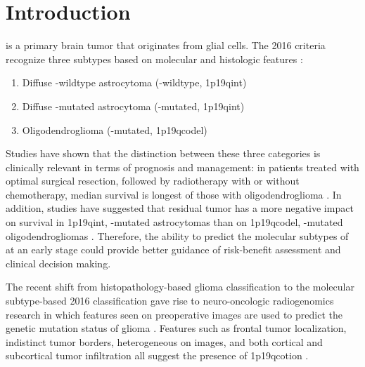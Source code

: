 \section{Introduction}

 is a primary brain \gls{tumor} that originates from glial cells.
The  2016 criteria recognize three subtypes based on molecular and histologic features \autocite{louis20162016,van2017diffuse}:

\begin{enumerate}
\item Diffuse -wildtype astrocytoma (-wildtype, \acl{1p19qint})
\item Diffuse -mutated astrocytoma (-mutated, \acl{1p19qint})
\item Oligodendroglioma (-mutated, \acl{1p19qcodel})
\end{enumerate}

Studies have shown that the distinction between these three categories is clinically relevant in terms of prognosis and management: in patients treated with optimal surgical resection, followed by radiotherapy with or without chemotherapy, median survival is longest of those with oligodendroglioma \autocite{cairncross2014benefit, dubbink2015molecular}.
In addition, studies have suggested that residual \gls{tumor} has a more negative impact on survival in \acl{1p19qint}, -mutated astrocytomas than on \acl{1p19qcodel}, -mutated oligodendrogliomas \autocite{wijnenga2017impact, clark2019extent}.
Therefore, the ability to predict the molecular subtypes of  at an early stage could provide better guidance of risk-benefit assessment and clinical decision making.

The recent shift from histopathology-based glioma classification to the molecular subtype-based  2016 classification gave rise to neuro-oncologic radiogenomics research in which features seen on preoperative  images are used to predict the genetic mutation status of glioma \autocite{smits2017imaging, gevaert2014glioblastoma, gutman2013mr}.
Features such as frontal \gls{tumor} localization, indistinct \gls{tumor} borders, heterogeneous  on  images, and both cortical and subcortical \gls{tumor} infiltration all suggest the presence of \acl{1p19qcotion} \autocite{smits2017imaging}.

